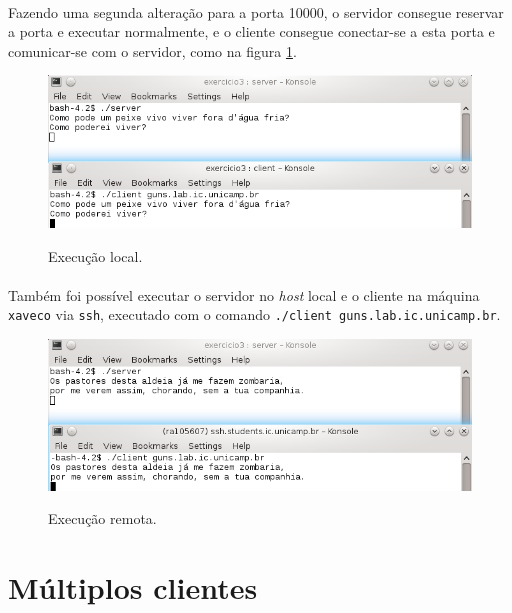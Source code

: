 \documentclass[a4paper,10pt,oneside,final,titlepage,onecolumn]{article}
\begin{document}
\paragraph{}Fazendo uma segunda alteração para a porta 10000, o servidor consegue reservar a porta e executar normalmente, e o cliente consegue conectar-se a esta porta e comunicar-se com o servidor, como na figura \ref{exec-local}.
\begin{figure}[!ht]
  \caption{Execução local.}
  \centering
  \includegraphics[width=117mm]{images/exec-local.png}
  \label{exec-local}
\end{figure}
\paragraph{}Também foi possível executar o servidor no \emph{host} local e o cliente na máquina \verb|xaveco| via \verb|ssh|, executado com o comando \verb|./client guns.lab.ic.unicamp.br|.
\begin{figure}[!ht]
  \caption{Execução remota.}
  \centering
  \includegraphics[width=117mm]{images/exec-remota.png}
  \label{exec-remota}
\end{figure}



\FloatBarrier
\section{Múltiplos clientes}
\end{document}
